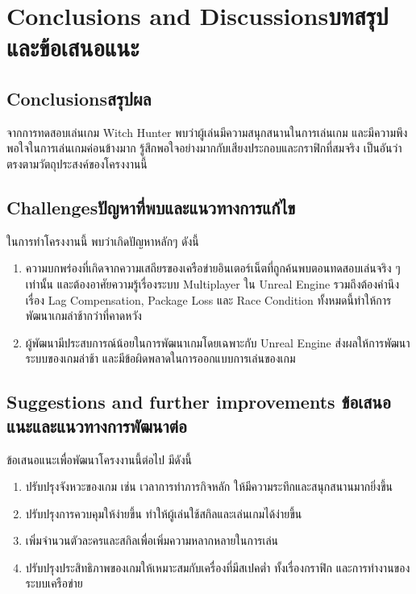 \chapter{\ifenglish Conclusions and Discussions\else บทสรุปและข้อเสนอแนะ\fi}

\section{\ifenglish Conclusions\else สรุปผล\fi}

จากการทดสอบเล่นเกม Witch Hunter พบว่าผู้เล่นมีความสนุกสนานในการเล่นเกม และมีความพึงพอใจในการเล่นเกมค่อนข้างมาก
รู้สึกพอใจอย่างมากกับเสียงประกอบและกราฟิกที่สมจริง เป็นอันว่าตรงตามวัตถุประสงค์ของโครงงานนี้

\section{\ifenglish Challenges\else ปัญหาที่พบและแนวทางการแก้ไข\fi}

ในการทำโครงงานนี้ พบว่าเกิดปัญหาหลักๆ ดังนี้
\begin{enumerate}
    \item ความบกพร่องที่เกิดจากความเสถียรของเครือข่ายอินเตอร์เน็ตที่ถูกค้นพบตอนทดสอบเล่นจริง ๆ เท่านั้น 
    และต้องอาศัยความรู้เรื่องระบบ Multiplayer ใน Unreal Engine รวมถึงต้องคำนึงเรื่อง Lag Compensation, 
    Package Loss และ Race Condition ทั้งหมดนี้ทำให้การพัฒนาเกมล่าช้ากว่าที่คาดหวัง
    \item ผู้พัฒนามีประสบการณ์น้อยในการพัฒนาเกมโดยเฉพาะกับ Unreal Engine ส่งผลให้การพัฒนาระบบของเกมล่าช้า 
    และมีข้อผิดพลาดในการออกแบบการเล่นของเกม
\end{enumerate}

\section{\ifenglish%
Suggestions and further improvements
\else%
ข้อเสนอแนะและแนวทางการพัฒนาต่อ
\fi
}

ข้อเสนอแนะเพื่อพัฒนาโครงงานนี้ต่อไป มีดังนี้
\begin{enumerate}
    \item ปรับปรุงจังหวะของเกม เช่น เวลาการทำภารกิจหลัก ให้มีความระทึกและสนุกสนานมากยิ่งขึ้น
    \item ปรับปรุงการควบคุมให้ง่ายขึ้น ทำให้ผู้เล่นใช้สกิลและเล่นเกมได้ง่ายขึ้น
    \item เพิ่มจำนวนตัวละครและสกิลเพื่อเพิ่มความหลากหลายในการเล่น
    \item ปรับปรุงประสิทธิภาพของเกมให้เหมาะสมกับเครื่องที่มีสเปคต่ำ ทั้งเรื่องกราฟิก และการทำงานของ
    ระบบเครือข่าย
\end{enumerate}
